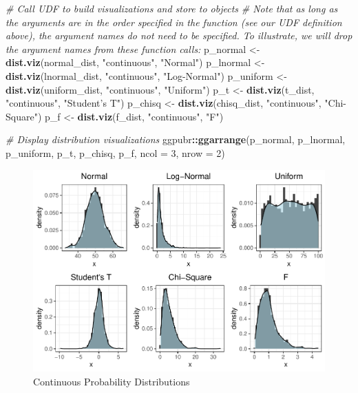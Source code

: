 \documentclass[]{book}
\newenvironment{Shaded}{\begin{snugshade}}{\end{snugshade}}
\newcommand{\CommentTok}[1]{\textcolor[rgb]{0.56,0.35,0.01}{\textit{#1}}}
\newcommand{\DataTypeTok}[1]{\textcolor[rgb]{0.13,0.29,0.53}{#1}}
\newcommand{\DecValTok}[1]{\textcolor[rgb]{0.00,0.00,0.81}{#1}}
\newcommand{\KeywordTok}[1]{\textcolor[rgb]{0.13,0.29,0.53}{\textbf{#1}}}
\newcommand{\NormalTok}[1]{#1}
\newcommand{\OperatorTok}[1]{\textcolor[rgb]{0.81,0.36,0.00}{\textbf{#1}}}
\newcommand{\StringTok}[1]{\textcolor[rgb]{0.31,0.60,0.02}{#1}}
\begin{document}
\begin{Shaded}
\begin{Highlighting}[]
\CommentTok{# Call UDF to build visualizations and store to objects}
\CommentTok{# Note that as long as the arguments are in the order specified in the function (see our UDF definition above), the argument names do not need to be specified. To illustrate, we will drop the argument names from these function calls:}
\NormalTok{p_normal <-}\StringTok{ }\KeywordTok{dist.viz}\NormalTok{(normal_dist, }\StringTok{"continuous"}\NormalTok{, }\StringTok{"Normal"}\NormalTok{)}
\NormalTok{p_lnormal <-}\StringTok{ }\KeywordTok{dist.viz}\NormalTok{(lnormal_dist, }\StringTok{"continuous"}\NormalTok{, }\StringTok{"Log-Normal"}\NormalTok{)}
\NormalTok{p_uniform <-}\StringTok{ }\KeywordTok{dist.viz}\NormalTok{(uniform_dist, }\StringTok{"continuous"}\NormalTok{, }\StringTok{"Uniform"}\NormalTok{)}
\NormalTok{p_t <-}\StringTok{ }\KeywordTok{dist.viz}\NormalTok{(t_dist, }\StringTok{"continuous"}\NormalTok{, }\StringTok{"Student's T"}\NormalTok{)}
\NormalTok{p_chisq <-}\StringTok{ }\KeywordTok{dist.viz}\NormalTok{(chisq_dist, }\StringTok{"continuous"}\NormalTok{, }\StringTok{"Chi-Square"}\NormalTok{)}
\NormalTok{p_f <-}\StringTok{ }\KeywordTok{dist.viz}\NormalTok{(f_dist, }\StringTok{"continuous"}\NormalTok{, }\StringTok{"F"}\NormalTok{)}

\CommentTok{# Display distribution visualizations}
\NormalTok{ggpubr}\OperatorTok{::}\KeywordTok{ggarrange}\NormalTok{(p_normal, p_lnormal, p_uniform, p_t, p_chisq, p_f,}
          \DataTypeTok{ncol =} \DecValTok{3}\NormalTok{, }\DataTypeTok{nrow =} \DecValTok{2}\NormalTok{)}
\end{Highlighting}
\end{Shaded}

\begin{figure}

{\centering \includegraphics{People_Analytics_Lifecycle_files/figure-latex/continous-dist-1} 

}

\caption{Continuous Probability Distributions}\label{fig:continous-dist}
\end{figure}
\end{document}
